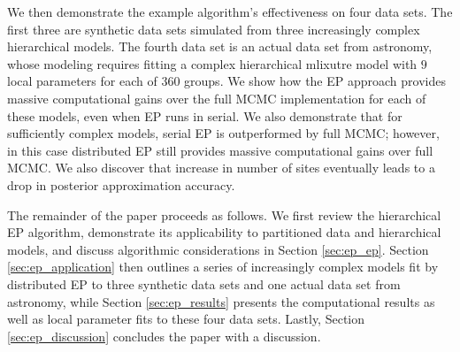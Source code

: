 We then demonstrate the example algorithm's effectiveness on four data sets. The first three are synthetic data sets simulated from three increasingly complex hierarchical models. The fourth data set is an actual data set from astronomy, whose modeling requires fitting a complex hierarchical mlixutre model with $9$ local parameters for each of $360$ groups. We show how the EP approach provides massive computational gains over the full MCMC implementation for each of these models, even when EP runs in serial. We also demonstrate that for sufficiently complex models, serial EP is outperformed by full MCMC; however, in this case distributed EP still provides massive computational gains over full MCMC. We also discover that increase in number of sites eventually leads to a drop in posterior approximation accuracy.

The remainder of the paper proceeds as follows. We first review the hierarchical EP algorithm, demonstrate its applicability to partitioned data and hierarchical models, and discuss algorithmic considerations in Section \ref{sec:ep_ep}. Section \ref{sec:ep_application} then outlines a series of increasingly complex models fit by distributed EP to three synthetic data sets and one actual data set from astronomy, while Section \ref{sec:ep_results} presents the computational results as well as local parameter fits to these four data sets. Lastly, Section \ref{sec:ep_discussion} concludes the paper with a discussion.